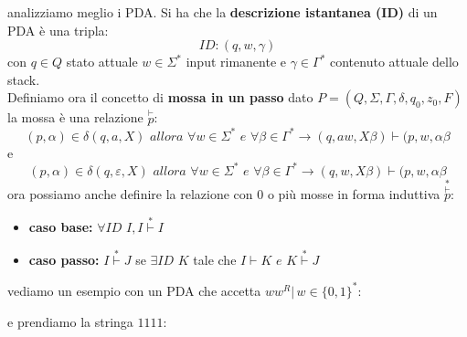 \documentclass[a4paper,12pt, oneside]{book}
\begin{document}
analizziamo meglio i PDA. Si ha che la \textbf{descrizione istantanea (ID)} di un PDA è una tripla:
$$ID:(q,w,\gamma)$$
con $q\in Q$ stato attuale $w\in\Sigma^*$ input rimanente e $\gamma\in\Gamma^*$ contenuto attuale dello stack.\\
Definiamo ora il concetto di \textbf{mossa in un passo}
dato $P=(Q,\Sigma,\Gamma,\delta,q_0,z_0,F)$ la mossa è una relazione $\stackrel{\vdash}{p}$:
$$(p,\alpha)\in\delta(q,a,X)\,\,allora\,\,\forall w\in\Sigma^*\,\,e\,\, \forall\beta\in\Gamma^*\to (q,aw,X\beta)\vdash(p,w,\alpha\beta$$
e
$$(p,\alpha)\in\delta(q,\varepsilon,X)\,\,allora\,\,\forall w\in\Sigma^*\,\,e\,\, \forall\beta\in\Gamma^*\to (q,w,X\beta)\vdash(p,w,\alpha\beta$$
\newpage
ora possiamo anche definire la relazione con 0 o più mosse 
in forma induttiva $\stackrel{*}{\stackrel{\vdash}{p}}$:
\begin{itemize}
\item \textbf{caso base:} $\forall ID\,\,I, I \stackrel{*}{\vdash} I$
\item \textbf{caso passo:} $I \stackrel{*}{\vdash} J$ se $\exists ID\,\,K$ tale che $ I\vdash K \,\,e\,\, K \stackrel{*}{\vdash} J$
\end{itemize}
vediamo un esempio con un PDA che accetta $ww^R|\,w\in\{0,1\}^*$:
\begin{center}
\end{center}
e prendiamo la stringa $1111$:\\
\end{document}
